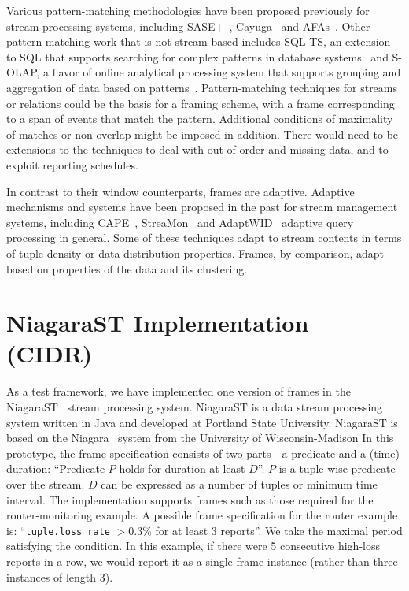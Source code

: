 \documentclass{vldb}
\newcommand{\dquote}[1]{``#1''}
\begin{document}
\begin{appendix}
Various pattern-matching methodologies have been proposed previously for stream-processing systems, including SASE+~\cite{ADG+2008}, Cayuga~\cite{BDG+2007} and AFAs~\cite{CGM2010}. Other pattern-matching work that is not stream-based includes SQL-TS, an extension to SQL that supports searching for complex patterns in database systems~\cite{SZZ+2004} and S-OLAP, a flavor of online analytical processing system that supports grouping and aggregation of data based on patterns~\cite{CKL+2010}. Pattern-matching techniques for streams or relations could be the basis for a framing scheme, with a frame corresponding to a span of events that match the pattern. Additional conditions of maximality of matches or non-overlap might be imposed in addition. There would need to be extensions to the techniques to deal with out-of order and missing data, and to exploit reporting schedules.

In contrast to their window counterparts, frames are adaptive. Adaptive mechanisms and systems have been proposed in the past for stream management systems, including CAPE~\cite{RDS+2004}, StreaMon~\cite{BW2004} and AdaptWID~\cite{LTD+2008} adaptive query processing in general. Some of these techniques adapt to stream contents in terms of tuple density or data-distribution properties. Frames, by comparison, adapt based on properties of the data and its clustering.

\section{NiagaraST Implementation (CIDR)}
\label{sec:implementation-cidr}

As a test framework, we have implemented one version of frames in the NiagaraST~\cite{LMT+2005a} stream processing system. NiagaraST is a data stream processing system written in Java and developed at Portland State University. NiagaraST is based on the Niagara~\cite{NDM+2001} system from the University of Wisconsin-Madison In this prototype, the frame specification consists of two parts---a predicate and a (time) duration: \dquote{Predicate $P$ holds for duration at least $D$}. $P$ is a tuple-wise predicate over the stream. $D$ can be expressed as a number of tuples or minimum time interval. The implementation supports frames such as those required for the router-monitoring example. A possible frame specification for the router example is: \dquote{\texttt{tuple.loss\_rate} $> 0.3\%$ for at least 3 reports}. We take the maximal period satisfying the condition. In this example, if there were 5 consecutive high-loss reports in a row, we would report it as a single frame instance (rather than three instances of length 3).


\end{appendix}
\end{document}
